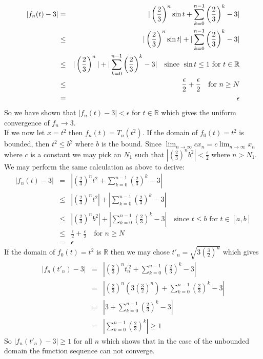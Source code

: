 \documentclass[11pt,reqno]{article}
\begin{document}
\begin{eqnarray*}
|f_n(t) - 3| &=& |\left( \frac{2}{3} \right)^n \sin t + \sum_{k=0}^{n-1} \left( \frac{2}{3} \right)^k - 3| \\
		&\le& |\left( \frac{2}{3} \right)^n \sin t| + |\sum_{k=0}^{n-1} \left( \frac{2}{3} \right)^k - 3| \\
		&\le& |\left( \frac{2}{3} \right)^n| + |\sum_{k=0}^{n-1} \left( \frac{2}{3} \right)^k - 3| \quad \text{since \;$\sin t \le 1$ for $t \in \mathbb{R}$} \\
		&\le& \frac{\epsilon}{2} + \frac{\epsilon}{2} \quad \text{for $n \ge N$} \\
		&=& \epsilon
\end{eqnarray*}
So we have shown that $|f_n(t) - 3| < \epsilon$ for $t \in \mathbb{R}$ which gives the uniform convergence of $f_n \to 3$.\\
\indent If we now let $x = t^2$ then $f_n(t) = T_n(t^2)$. If the domain of $f_0(t) = t^2$ is bounded, then $t^2 \le b^2$ where $b$ is the bound. Since $\lim_{n \to \infty} c x_n = c \lim_{n \to \infty} x_n$ where $c$ is a constant we may pick an $N_1$ such that $|\left( \frac{2}{3} \right)^n b^2| < \frac{\epsilon}{2}$ where $n > N_1$. We may perform the same calculation as above to derive:
\begin{eqnarray*}
|f_n(t) - 3| &=& |\left( \frac{2}{3} \right)^n t^2 + \sum_{k=0}^{n-1} \left( \frac{2}{3} \right)^k - 3| \\
		&\le& |\left( \frac{2}{3} \right)^n t^2| + |\sum_{k=0}^{n-1} \left( \frac{2}{3} \right)^k - 3| \\
		&\le& |\left( \frac{2}{3} \right)^n b^2| + |\sum_{k=0}^{n-1} \left( \frac{2}{3} \right)^k - 3| \quad \text{since $t \le b$ for $t \in [a,b]$} \\
		&\le& \frac{\epsilon}{2} + \frac{\epsilon}{2} \quad \text{for $n \ge N$} \\
		&=& \epsilon
\end{eqnarray*}
If the domain of $f_0(t) = t^2$ is $\mathbb{R}$ then we may chose $t'_n = \sqrt{3 \left( \frac{3}{2} \right)^n}$ which gives 
\begin{eqnarray*}
 |f_n(t'_n) - 3| &=& |\left( \frac{2}{3} \right)^n t_n^{'2} + \sum_{k=0}^{n-1} \left( \frac{2}{3} \right)^k - 3| \\
 		      &=& |\left( \frac{2}{3} \right)^n \left( 3 \left( \frac{3}{2} \right)^n \right) + \sum_{k=0}^{n-1} \left( \frac{2}{3} \right)^k - 3| \\
		      &=& | 3 + \sum_{k=0}^{n-1} \left( \frac{2}{3} \right)^k - 3| \\
		      &=& |\sum_{k=0}^{n-1} \left( \frac{2}{3} \right)^k| \ge 1
\end{eqnarray*}
So $ |f_n(t'_n) - 3| \ge 1$ for all $n$ which shows that in the case of the unbounded domain the function sequence can not converge.
\newpage
 
\end{document}
